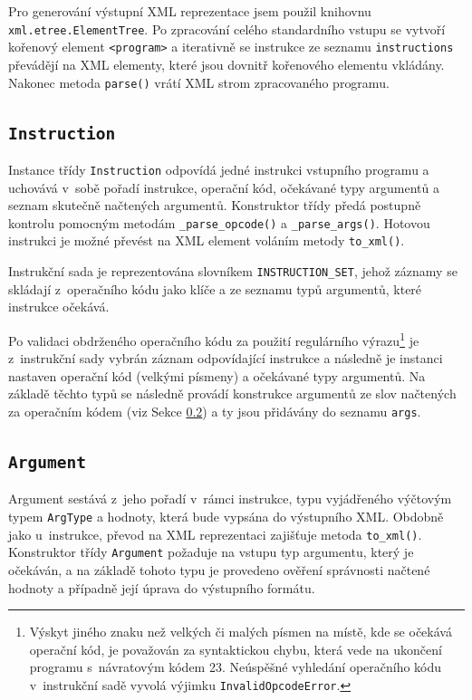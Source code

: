 \documentclass{article}[a4paper]
\begin{document}
    Pro generování výstupní XML reprezentace jsem použil knihovnu \texttt{xml.etree.ElementTree}.
    Po zpracování celého standardního vstupu se vytvoří kořenový element \texttt{<program>} a iterativně se instrukce ze seznamu \texttt{instructions}
    převádějí na XML elementy, které jsou dovnitř kořenového elementu vkládány.
    Nakonec metoda \texttt{parse()} vrátí XML strom zpracovaného programu.

    \subsection{\texttt{Instruction}}
    \label{sec:instruction}

    Instance třídy \texttt{Instruction} odpovídá jedné instrukci vstupního programu a uchovává v~sobě pořadí instrukce, operační kód, očekávané typy argumentů a seznam skutečně načtených argumentů.
    Konstruktor třídy předá postupně kontrolu pomocným metodám \texttt{\_parse\_opcode()} a \texttt{\_parse\_args()}.
    Hotovou instrukci je možné převést na XML element voláním metody \texttt{to\_xml()}.

    Instrukční sada je reprezentována slovníkem \texttt{INSTRUCTION\_SET}, jehož záznamy se skládají z~operačního kódu jako klíče a ze seznamu typů argumentů, které instrukce očekává.

    Po validaci obdrženého operačního kódu za použití regulárního výrazu\footnote{Výskyt jiného znaku než velkých či malých písmen na místě, kde se očekává operační kód, je považován za syntaktickou chybu,
    která vede na ukončení programu s~návratovým kódem 23. Neúspěšné vyhledání operačního kódu v~instrukční sadě vyvolá výjimku \texttt{InvalidOpcodeError}.}
    je z~instrukční sady vybrán záznam odpovídající instrukce a následně je instanci nastaven operační kód (velkými písmeny) a očekávané typy argumentů.
    Na základě těchto typů se následně provádí konstrukce argumentů ze slov načtených za operačním kódem (viz Sekce \ref{sec:argument}) a ty jsou přidávány do seznamu \texttt{args}.

    \subsection{\texttt{Argument}}
    \label{sec:argument}

    Argument sestává z~jeho pořadí v~rámci instrukce, typu vyjádřeného výčtovým typem \texttt{ArgType} a hodnoty, která bude vypsána do výstupního XML.
    Obdobně jako u~instrukce, převod na XML reprezentaci zajišťuje metoda \texttt{to\_xml()}.
    Konstruktor třídy \texttt{Argument} požaduje na vstupu typ argumentu, který je očekáván, a na základě tohoto typu je provedeno ověření správnosti načtené hodnoty a případně její úprava do výstupního formátu.
\end{document}
